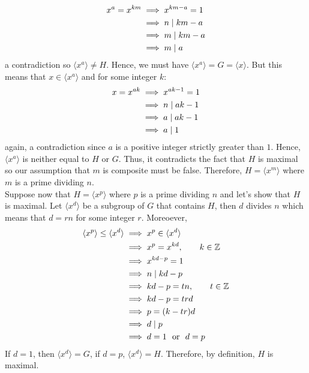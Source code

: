 \begin{solution}
\begin{enumerate}[label = \textbf{(\alph*)}]
        \begin{align*}
            x^a = x^{km} &\implies x^{km-a} = 1 \\
            &\implies n \mathrel{|} km - a \\
            &\implies m \mathrel{|} km - a \\
            &\implies m \mathrel{|} a
        \end{align*}
        a contradiction so $\langle x^a \rangle \neq H$. Hence, we must have $\langle x^a \rangle = G = \langle x \rangle$. But this means that $x \in \langle x^a \rangle$ and for some integer $k$:
        \begin{align*}
            x = x^{ak} &\implies x^{ak - 1} = 1 \\
            &\implies n \mathrel{|} ak - 1 \\
            &\implies a \mathrel{|} ak - 1 \\
            &\implies a \mathrel{|} 1
        \end{align*}
        again, a contradiction since $a$ is a positive integer strictly greater than $1$. Hence, $\langle x^a \rangle$ is neither equal to $H$ or $G$. Thus, it contradicts the fact that $H$ is maximal so our assumption that $m$ is composite must be false. Therefore, $H = \langle x^m \rangle$ where $m$ is a prime dividing $n$. \\
        Suppose now that $H = \langle x^p \rangle$ where $p$ is a prime dividing $n$ and let's show that $H$ is maximal. Let $\langle x^d \rangle$ be a subgroup of $G$ that contains $H$, then $d$ divides $n$ which means that $d = rn$ for some integer $r$. Moreoever,  
        \begin{align*}
            \langle x^p \rangle \leq \langle x^d \rangle &\implies x^p \in  \langle x^d \rangle \\
            &\implies x^p = x^{kd}, \qquad k\in\mathbb{Z} \\
            &\implies x^{kd - p} = 1 \\
            &\implies n \mathrel{|} kd - p \\
            &\implies kd - p = tn, \qquad t\in\mathbb{Z} \\
            &\implies kd - p = trd \\
            &\implies p = (k - tr)d \\
            &\implies d \mathrel{|} p \\
            &\implies d = 1 \ \text{ or } \ d = p
        \end{align*}
        If $d = 1$, then $\langle x^d \rangle = G$, if $d = p$, $\langle x^d \rangle = H$. Therefore, by definition, $H$ is maximal.\\
    \end{enumerate}
\end{solution}

